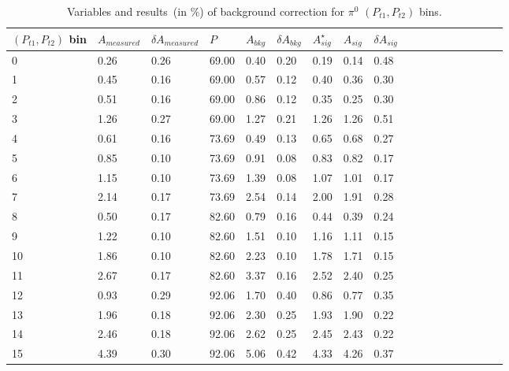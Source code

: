 \begin{table}[H]\footnotesize
\centering
\begin{tabular}{|l|l|l|l|l|l|l|l|l|l|l|l|l|l|l|l|l|l|}
\\ \hline
$(P_{t1},P_{t2})$ bin & $A_{measured}$ & $\delta A_{measured}$ & $P$ & $A_{bkg}$ & $\delta A_{bkg}$ & $A_{sig}^{\star}$ & $ A_{sig}$  & $\delta A_{sig}$ \\ \hline
0 & 0.26 & 0.26 & 69.00 & 0.40 & 0.20 & 0.19 & 0.14 & 0.48 \\ \hline 
1 & 0.45 & 0.16 & 69.00 & 0.57 & 0.12 & 0.40 & 0.36 & 0.30 \\ \hline 
2 & 0.51 & 0.16 & 69.00 & 0.86 & 0.12 & 0.35 & 0.25 & 0.30 \\ \hline 
3 & 1.26 & 0.27 & 69.00 & 1.27 & 0.21 & 1.26 & 1.26 & 0.51 \\ \hline 
4 & 0.61 & 0.16 & 73.69 & 0.49 & 0.13 & 0.65 & 0.68 & 0.27 \\ \hline 
5 & 0.85 & 0.10 & 73.69 & 0.91 & 0.08 & 0.83 & 0.82 & 0.17 \\ \hline 
6 & 1.15 & 0.10 & 73.69 & 1.39 & 0.08 & 1.07 & 1.01 & 0.17 \\ \hline 
7 & 2.14 & 0.17 & 73.69 & 2.54 & 0.14 & 2.00 & 1.91 & 0.28 \\ \hline 
8 & 0.50 & 0.17 & 82.60 & 0.79 & 0.16 & 0.44 & 0.39 & 0.24 \\ \hline 
9 & 1.22 & 0.10 & 82.60 & 1.51 & 0.10 & 1.16 & 1.11 & 0.15 \\ \hline 
10 & 1.86 & 0.10 & 82.60 & 2.23 & 0.10 & 1.78 & 1.71 & 0.15 \\ \hline 
11 & 2.67 & 0.17 & 82.60 & 3.37 & 0.16 & 2.52 & 2.40 & 0.25 \\ \hline 
12 & 0.93 & 0.29 & 92.06 & 1.70 & 0.40 & 0.86 & 0.77 & 0.35 \\ \hline 
13 & 1.96 & 0.18 & 92.06 & 2.30 & 0.25 & 1.93 & 1.90 & 0.22 \\ \hline 
14 & 2.46 & 0.18 & 92.06 & 2.62 & 0.25 & 2.45 & 2.43 & 0.22 \\ \hline 
15 & 4.39 & 0.30 & 92.06 & 5.06 & 0.42 & 4.33 & 4.26 & 0.37 \\ \hline 
\end{tabular}
\caption{Variables and results~(in $\%$) of background correction for $\pi^0$ $(P_{t1},P_{t2})$ bins.}
\label{tab:comptbkgcor}
\end{table}  

